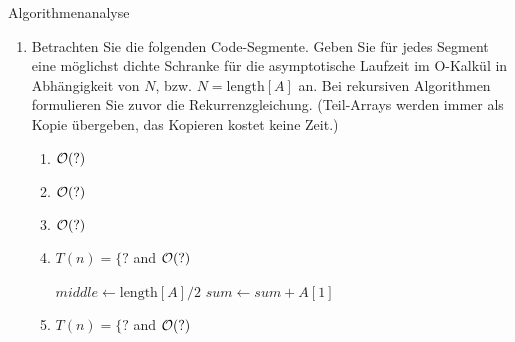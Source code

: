 \documentclass{article}
\begin{document}
\begin{exercise}{Algorithmenanalyse}
  \begin{enumerate}
    \item Betrachten Sie die folgenden Code-Segmente. Geben Sie für jedes Segment eine möglichst dichte Schranke für die asymptotische Laufzeit im O-Kalkül in Abhängigkeit von $N$, bzw. $N = \text{length}[A]$ an. Bei rekursiven Algorithmen formulieren Sie zuvor die Rekurrenzgleichung. (Teil-Arrays werden immer als Kopie übergeben, das Kopieren kostet keine Zeit.)
          \begin{enumerate}
            \item $\mathcal{O}(?)$
                  \begin{alg}
                  \end{alg}
            \item $\mathcal{O}(?)$
                  \begin{alg}
                  \end{alg}
            \item $\mathcal{O}(?)$
                  \begin{alg}
                  \end{alg}
            \item $T(n)=\{?$ and $\mathcal{O}(?)$
                  \begin{alg}
                    $middle \gets \text{length}[A]/2$\;
                    $sum \gets sum + A[1]$\;
                  \end{alg}
            \item $T(n)=\{?$ and $\mathcal{O}(?)$

\end{enumerate}
\end{enumerate}
\end{exercise}
\end{document}

